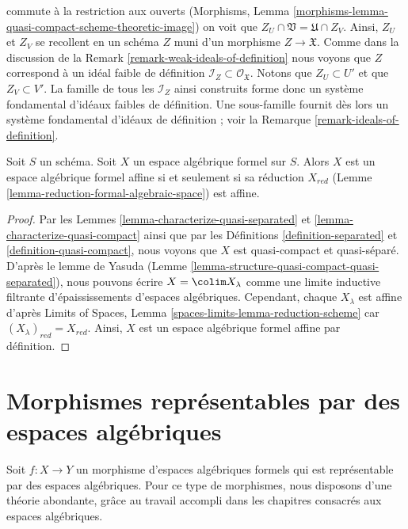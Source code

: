 \begin{remark}
commute à la restriction aux ouverts (Morphisms, Lemma
\ref{morphisms-lemma-quasi-compact-scheme-theoretic-image})
on voit que $Z_U \cap \mathfrak V = \mathfrak U \cap Z_V$.
Ainsi, $Z_U$ et $Z_V$ se recollent en un schéma $Z$ muni
d'un morphisme $Z \to \mathfrak X$. Comme dans la discussion de la
Remark \ref{remark-weak-ideals-of-definition}
nous voyons que $Z$ correspond à un idéal faible
de définition $\mathcal{I}_Z \subset \mathcal{O}_\mathfrak X$.
Notons que $Z_U \subset U'$ et que
$Z_V \subset V'$. La famille de tous les $\mathcal{I}_Z$
ainsi construits forme donc un système fondamental d'idéaux faibles
de définition. Une sous-famille fournit dès lors un système fondamental d'idéaux
de définition ; voir la Remarque \ref{remark-ideals-of-definition}.
\end{remark}

\begin{lemma}
\label{lemma-characterize-affine}
Soit $S$ un schéma. Soit $X$ un espace algébrique formel sur $S$.
Alors $X$ est un espace algébrique formel affine si et seulement si
sa réduction $X_{red}$ (Lemme \ref{lemma-reduction-formal-algebraic-space})
est affine.
\end{lemma}

\begin{proof}
Par les Lemmes \ref{lemma-characterize-quasi-separated} et
\ref{lemma-characterize-quasi-compact} ainsi que par les
Définitions \ref{definition-separated} et \ref{definition-quasi-compact},
nous voyons que $X$ est quasi-compact et quasi-séparé.
D'après le lemme de Yasuda (Lemme \ref{lemma-structure-quasi-compact-quasi-separated}),
nous pouvons écrire $X = \colim X_\lambda$ comme une limite inductive filtrante
d'épaississements d'espaces algébriques. Cependant, chaque $X_\lambda$
est affine d'après Limits of Spaces, Lemma
\ref{spaces-limits-lemma-reduction-scheme}
car $(X_\lambda)_{red} = X_{red}$.
Ainsi, $X$ est un espace algébrique formel affine par définition.
\end{proof}






\section{Morphismes représentables par des espaces algébriques}
\label{section-representable}

\noindent
Soit $f : X \to Y$ un morphisme d'espaces algébriques formels qui
est représentable par des espaces algébriques. Pour ce type de morphismes,
nous disposons d'une théorie abondante, grâce au travail accompli
dans les chapitres consacrés aux espaces algébriques.


